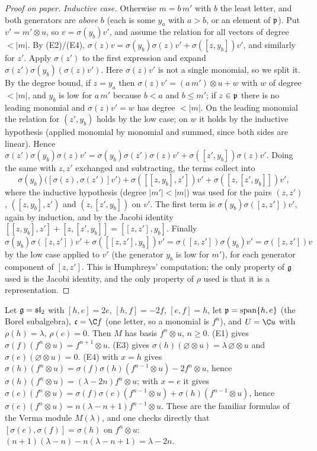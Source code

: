 \begin{proof}[Proof on paper]
\emph{Inductive case.} Otherwise $m = b\,m'$ with $b$ the least letter, and both generators are
\emph{above} $b$ (each is some $y_a$ with $a>b$, or an element of $\mathfrak{p}$). Put $v' = m'\otimes u$, so
$v = \sigma(y_b)v'$, and assume the relation for all vectors of degree $<|m|$. By (E2)/(E4),
$\sigma(z)v = \sigma(y_b)\sigma(z)v' + \sigma([z,y_b])v'$, and similarly for $z'$. Apply $\sigma(z')$ to the
first expression and expand $\sigma(z')\sigma(y_b)(\sigma(z)v')$. Here $\sigma(z)v'$ is not a single monomial,
so we split it. By the degree bound, if $z = y_a$ then $\sigma(z)v' = (a\,m')\otimes u + w$ with $w$ of degree
$<|m|$, and $y_b$ is low for $a\,m'$ because $b<a$ and $b\le m'$; if $z\in\mathfrak{p}$ there is no leading monomial
and $\sigma(z)v' = w$ has degree $<|m|$. On the leading monomial the relation for $(z',y_b)$ holds by the
low case; on $w$ it holds by the inductive hypothesis (applied monomial by monomial and summed, since both
sides are linear). Hence $\sigma(z')\sigma(y_b)\sigma(z)v' = \sigma(y_b)\sigma(z')\sigma(z)v' +
\sigma([z',y_b])\sigma(z)v'$. Doing the same
with $z,z'$ exchanged and subtracting, the terms collect into
\begin{equation*}
 \sigma(y_b)\bigl([\sigma(z),\sigma(z')]v'\bigr) + \sigma([[z,y_b],z'])v' + \sigma([z,[z',y_b]])v',
\end{equation*}
where the inductive hypothesis (degree $|m'| < |m|$) was used for the pairs $(z,z')$, $([z,y_b],z')$ and
$(z,[z',y_b])$ on $v'$. The first term is $\sigma(y_b)\sigma([z,z'])v'$, again by induction, and by the Jacobi
identity $[[z,y_b],z'] + [z,[z',y_b]] = [[z,z'],y_b]$. Finally
$\sigma(y_b)\sigma([z,z'])v' + \sigma([[z,z'],y_b])v' = \sigma([z,z'])\sigma(y_b)v' = \sigma([z,z'])v$ by the low case
applied to $v'$ (the generator $y_b$ is low for $m'$), for each generator component of $[z,z']$. This is
Humphreys' computation; the only property of $\mathfrak{g}$ used is the Jacobi identity, and the only property of
$\rho$ used is that it is a representation.
\end{proof}

\begin{example}\label{l02:ex:relrep}
Let $\mathfrak{g} = \mathfrak{sl}_2$ with $[h,e] = 2e$, $[h,f] = -2f$, $[e,f] = h$, let $\mathfrak{p} = \operatorname{span}\{h,e\}$
(the Borel subalgebra), $\mathfrak c = \C f$ (one letter, so a monomial is $f^n$), and $U = \C u$ with
$\rho(h) = \lambda$, $\rho(e) = 0$. Then $M$ has basis $f^n\otimes u$, $n\ge0$. (E1) gives
$\sigma(f)(f^n\otimes u) = f^{n+1}\otimes u$. (E3) gives $\sigma(h)(\varnothing\otimes u) = \lambda\,\varnothing\otimes u$ and
$\sigma(e)(\varnothing\otimes u) = 0$. (E4) with $x = h$ gives
$\sigma(h)(f^n\otimes u) = \sigma(f)\sigma(h)(f^{n-1}\otimes u) - 2f^n\otimes u$, hence $\sigma(h)(f^n\otimes u) =
(\lambda-2n)f^n\otimes u$; with $x = e$ it gives $\sigma(e)(f^n\otimes u) = \sigma(f)\sigma(e)(f^{n-1}\otimes u) +
\sigma(h)(f^{n-1}\otimes u)$, hence $\sigma(e)(f^n\otimes u) = n(\lambda-n+1)f^{n-1}\otimes u$. These are the familiar
formulas of the Verma module $M(\lambda)$, and one checks directly that
$[\sigma(e),\sigma(f)] = \sigma(h)$ on $f^n\otimes u$: $(n+1)(\lambda-n) - n(\lambda-n+1) = \lambda-2n$.
\end{example}

